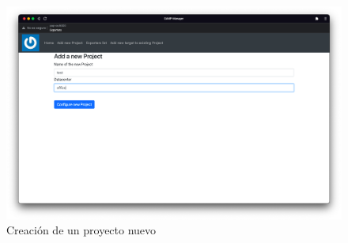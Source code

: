 \begin{figure}[H]
    \includegraphics[width=\textwidth]{include/desarrollo/app_images/create_project.png}
    \caption{Creación de un proyecto nuevo}
    \label{fig:gui_create_project}
\end{figure}

